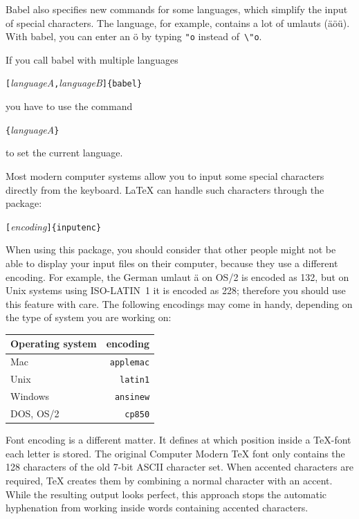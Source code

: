 \textsf{Babel} also specifies new commands for some languages, which
simplify the input of special characters. The  language, for
example, contains a lot of umlauts (\"a\"o\"u).  With \textsf{babel},
you can enter an \"o by typing \verb|"o| instead of~\verb|\"o|.

If you call babel with multiple languages
\begin{lscommand}
\verb|[|\emph{languageA}\verb|,|\emph{languageB}\verb|]{babel}| 
\end{lscommand}
\noindent you have to use the command
\begin{lscommand}
\verb|{|\emph{languageA}\verb|}|
\end{lscommand}
\noindent to set the current language.

Most modern computer systems allow you to input some special characters
directly from the keyboard. \LaTeX{} can handle such characters through the
 package:
\begin{lscommand}
\verb|[|\emph{encoding}\verb|]{inputenc}| 
\end{lscommand}

When using this package, you should consider
that other people might not be able to display your input files on
their computer, because they use a different encoding. For example,
the German umlaut \"a on OS/2 is encoded as 132, but on Unix
systems using ISO-LATIN~1 it is encoded as 228; therefore you should
use this feature with care. The following encodings may come in handy,
depending on the type of system you are working on: 

\begin{center}
\begin{tabular}{l | r}
Operating system & encoding\\
\hline
Mac     &  \texttt{applemac} \\
Unix    &  \texttt{latin1} \\ 
Windows &  \texttt{ansinew} \\
DOS, OS/2    &  \texttt{cp850}
\end{tabular}
\end{center}

Font encoding is a different matter. It defines at which position inside
a \TeX-font each letter is stored. The original Computer Modern
\TeX{} font only contains the 128 characters of the old 7-bit ASCII
character set. When accented characters are required, \TeX{} creates
them by combining a normal character with an accent. While the
resulting output looks perfect, this approach stops the automatic
hyphenation from working inside words containing accented characters.

